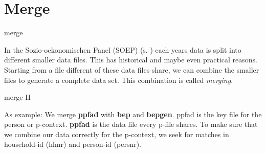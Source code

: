 \section{Merge}
\begin{frame}{merge} 
\begin{minipage}{11cm}
In the Sozio-oekonomischen Panel (SOEP) (s. \cite{Wagner07}) each years data is split into different smaller data files. This has historical and maybe even practical reasons.\\
Starting from a file different of these data files share, we can combine the smaller files to generate a complete data set. This combination is called \textit{merging}.
\end{minipage}
\end{frame}

\begin{frame}[fragile]{merge II} 
\begin{minipage}{11cm}
As example: We merge \textbf{ppfad} with \textbf{bep} and \textbf{bepgen}. ppfad is the key file for the person or p-context. \textbf{ppfad} is the data file every p-file shares. To make sure that we combine our data correctly for the p-context, we seek for matches in household-id (hhnr) and person-id (persnr).\\

\end{minipage}
\end{frame}


